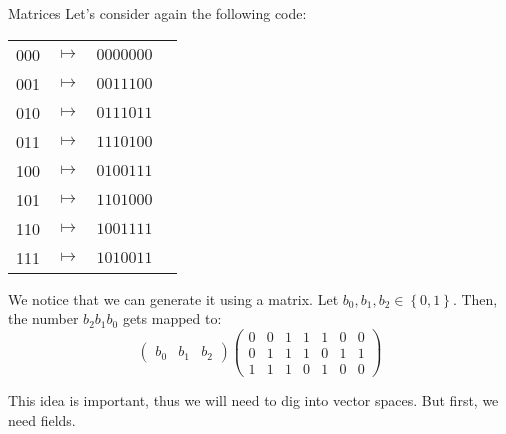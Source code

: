 \documentclass[a4paper]{article}
\begin{document}
\begin{parag}{Matrices}
    Let's consider again the following code:
    \begin{center}
    \begin{tabular}{cccc}
        000 & $\mapsto$ & $0000000$ \\
        001 & $\mapsto$ & $0011100$ \\
        010 & $\mapsto$ & $0111011$ \\
        011 & $\mapsto$ & $1110100$ \\
        100 & $\mapsto$ & $0100111$ \\
        101 & $\mapsto$ & $1101000$ \\
        110 & $\mapsto$ & $1001111$ \\
        111 & $\mapsto$ & $1010011$ 
    \end{tabular}
    \end{center}

    We notice that we can generate it using a matrix. Let $b_0, b_1, b_2 \in \left\{0, 1\right\}$. Then, the number $b_2 b_1 b_0$ gets mapped to: 
    \[\begin{pmatrix} b_0 & b_1 & b_2 \end{pmatrix} \begin{pmatrix} 0 & 0 & 1 & 1 & 1 & 0 & 0 \\ 0 & 1 & 1 & 1 & 0 & 1 & 1 \\ 1 & 1 & 1 & 0  & 1 & 0 & 0 \end{pmatrix} \]
    
    This idea is important, thus we will need to dig into vector spaces. But first, we need fields.
\end{parag}
\end{document}
